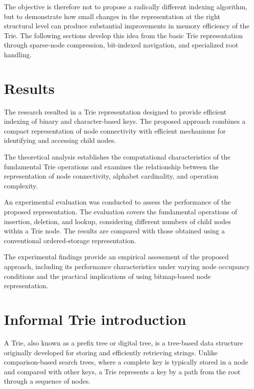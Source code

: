 \documentclass[11pt,twoside]{article}
\begin{document}
    The objective is therefore not to propose a radically different indexing algorithm, but to demonstrate how
    small changes in the representation at the right structural level can produce substantial improvements in
    memory efficiency of the Trie. The following sections develop this idea from the basic Trie representation
    through sparse-node compression, bit-indexed navigation, and specialized root handling.


    \section{Results}\label{sec:results}
        The research resulted in a Trie representation designed to provide efficient indexing of
        binary and character-based keys. The proposed approach combines a compact representation of node
        connectivity with efficient mechanisms for identifying and accessing child nodes.

        The theoretical analysis establishes the computational characteristics of the fundamental Trie operations
        and examines the relationship between the representation of node connectivity,
        alphabet cardinality, and operation complexity.

        An experimental evaluation was conducted to assess the performance of the proposed representation.
        The evaluation covers the fundamental operations of insertion, deletion, and lookup,
        considering different numbers of child nodes within a Trie node. The results are compared with
        those obtained using a conventional ordered-storage representation.

        The experimental findings provide an empirical assessment of the proposed approach,
        including its performance characteristics under varying node occupancy conditions and the practical
        implications of using bitmap-based node representation.

    \section{Informal Trie introduction}\label{sec:informal_intro}

    A Trie, also known as a prefix tree or digital tree, is a tree-based data structure
    originally developed for storing and efficiently retrieving strings. Unlike
    comparison-based search trees, where a complete key is typically stored in a node
    and compared with other keys, a Trie represents a key by a path from the root through a sequence of nodes.
\end{document}
